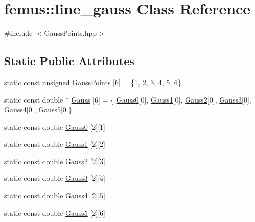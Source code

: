 \hypertarget{classfemus_1_1line__gauss}{}\section{femus\+:\+:line\+\_\+gauss Class Reference}
\label{classfemus_1_1line__gauss}


{\ttfamily \#include $<$Gauss\+Points.\+hpp$>$}

\subsection*{Static Public Attributes}
\begin{DoxyCompactItemize}
\item 
static const unsigned \mbox{\hyperlink{classfemus_1_1line__gauss_ae8174dc2135db3b599ac0e39eab5b95d}{Gauss\+Points}} \mbox{[}6\mbox{]} = \{1, 2, 3, 4, 5, 6\}
\item 
static const double $\ast$ \mbox{\hyperlink{classfemus_1_1line__gauss_a98d1a256c5c9b680c188abb8f773d960}{Gauss}} \mbox{[}6\mbox{]} = \{ \mbox{\hyperlink{classfemus_1_1line__gauss_a1e8041f638f61169aaa53eb0785605bd}{Gauss0}}\mbox{[}0\mbox{]}, \mbox{\hyperlink{classfemus_1_1line__gauss_a608a247f6e281ba3cc33d5c7cf7c26a5}{Gauss1}}\mbox{[}0\mbox{]}, \mbox{\hyperlink{classfemus_1_1line__gauss_a06822a846f9c487eac127761930838b9}{Gauss2}}\mbox{[}0\mbox{]}, \mbox{\hyperlink{classfemus_1_1line__gauss_a3e4469455ddc119739471ab651b7dbff}{Gauss3}}\mbox{[}0\mbox{]}, \mbox{\hyperlink{classfemus_1_1line__gauss_ab2d03415a4eca319a16adfb8edb54074}{Gauss4}}\mbox{[}0\mbox{]}, \mbox{\hyperlink{classfemus_1_1line__gauss_a0f13fdd00e078abfb338deee2e1a1734}{Gauss5}}\mbox{[}0\mbox{]}\}
\item 
static const double \mbox{\hyperlink{classfemus_1_1line__gauss_a1e8041f638f61169aaa53eb0785605bd}{Gauss0}} \mbox{[}2\mbox{]}\mbox{[}1\mbox{]}
\item 
static const double \mbox{\hyperlink{classfemus_1_1line__gauss_a608a247f6e281ba3cc33d5c7cf7c26a5}{Gauss1}} \mbox{[}2\mbox{]}\mbox{[}2\mbox{]}
\item 
static const double \mbox{\hyperlink{classfemus_1_1line__gauss_a06822a846f9c487eac127761930838b9}{Gauss2}} \mbox{[}2\mbox{]}\mbox{[}3\mbox{]}
\item 
static const double \mbox{\hyperlink{classfemus_1_1line__gauss_a3e4469455ddc119739471ab651b7dbff}{Gauss3}} \mbox{[}2\mbox{]}\mbox{[}4\mbox{]}
\item 
static const double \mbox{\hyperlink{classfemus_1_1line__gauss_ab2d03415a4eca319a16adfb8edb54074}{Gauss4}} \mbox{[}2\mbox{]}\mbox{[}5\mbox{]}
\item 
static const double \mbox{\hyperlink{classfemus_1_1line__gauss_a0f13fdd00e078abfb338deee2e1a1734}{Gauss5}} \mbox{[}2\mbox{]}\mbox{[}6\mbox{]}
\end{DoxyCompactItemize}


